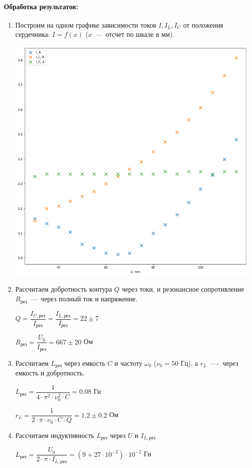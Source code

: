 \documentclass[a4paper, 12pt]{article}
\newcommand{\parag}[1]{\paragraph*{#1:}}
\begin{document}
\newpage

\parag{Обработка результатов} 

\begin{enumerate}
    \item Построим на одном графике зависимости токов $I, I_L, I_C$ от положения сердечника: $I = f(x)$ ($x$~---~отсчет по шкале в мм).
    
    \includegraphics[scale=0.5]{graph.png}
    
    \item Рассчитаем добротность контура $Q$ через токи, и резонансное сопротивление $R_{рез}$~---~через полный ток и напряжение.
    
    $Q = \dfrac{I_{C, рез}}{I_{рез}} = \dfrac{I_{L, рез}}{I_{рез}} = 22 \pm 7$

    $R_{рез} = \dfrac{U_0}{I_{рез}} = 667 \pm 20$ Ом

    \item Рассчитаем $L_{рез}$ через емкость $C$ и частоту $\omega_0$ ($\nu_0 = 50$ Гц), а $r_L$~----~через емкость и добротность.
    
    $L_{рез} = \dfrac{1}{4 \cdot \pi^2 \cdot \nu_0^2 \cdot C} = 0.08$ Гн
    
    $r_L = \dfrac{1}{2 \cdot \pi \cdot \nu_0 \cdot C \cdot Q} = 1.2 \pm 0.2$ Ом

    \item Рассчитаем индуктивность $L_{рез}$ через $U$ и $I_{L, рез}$
    
    $L_{рез} = \dfrac{U_0}{2 \cdot \pi \cdot I_{L, рез}} = (9 + 27 \cdot 10^{-2}) \cdot 10^{-2}$ Гн
\end{enumerate}
\end{document}
